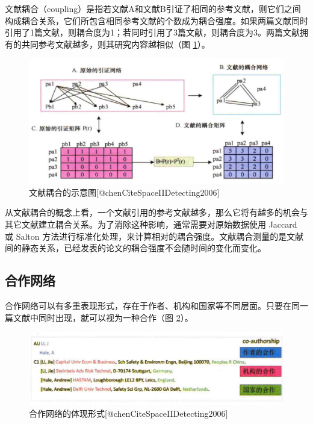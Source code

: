 \documentclass[]{ctexbook}
\begin{document}
文献耦合（coupling）是指若文献A和文献B引证了相同的参考文献，则它们之间构成耦合关系，它们所包含相同参考文献的个数成为耦合强度。如果两篇文献同时引用了1篇文献，则耦合度为1；若同时引用了3篇文献，则耦合度为3。两篇文献拥有的共同参考文献越多，则其研究内容越相似（图 \ref{fig:coupling-example}）。

\begin{figure}
\includegraphics[width=1\linewidth]{citespace/coupling-example} \caption{文献耦合的示意图[@chenCiteSpaceIIDetecting2006]}\label{fig:coupling-example}
\end{figure}

从文献耦合的概念上看，一个文献引用的参考文献越多，那么它将有越多的机会与其它文献建立耦合关系。为了消除这种影响，通常需要对原始数据使用 Jaccard 或 Salton 方法进行标准化处理，来计算相对的耦合强度。文献耦合测量的是文献间的静态关系，已经发表的论文的耦合强度不会随时间的变化而变化。

\hypertarget{ux5408ux4f5cux7f51ux7edc}{%
\subsection{合作网络}\label{ux5408ux4f5cux7f51ux7edc}}

合作网络可以有多重表现形式，存在于作者、机构和国家等不同层面。只要在同一篇文献中同时出现，就可以视为一种合作（图 \ref{fig:co-authorship-example}）。

\begin{figure}
\includegraphics[width=1\linewidth]{citespace/co-authorship-example} \caption{合作网络的体现形式[@chenCiteSpaceIIDetecting2006]}\label{fig:co-authorship-example}
\end{figure}
\end{document}
